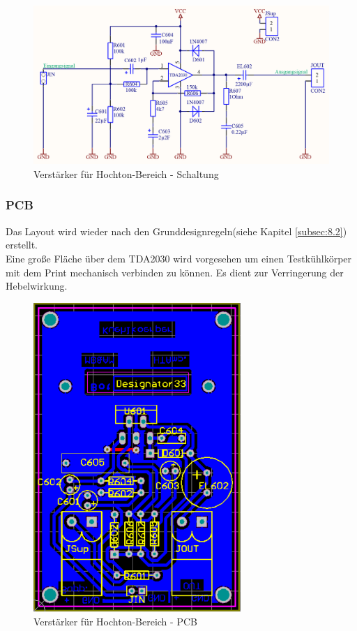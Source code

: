 \begin{figure} [H]
	\centering	
	\includegraphics[width=1\textwidth]{img/Print6/HTVerstaerker-Schem.PNG}
	\caption{Verstärker für Hochton-Bereich - Schaltung}
	\label {fig:5.1.2.1}
\end{figure}

\newpage
\subsubsection{PCB}\label{subsec:5.1.3}
Das Layout wird wieder nach den Grunddesignregeln(siehe Kapitel \ref{subsec:8.2}) erstellt.\\
Eine große Fläche über dem TDA2030 wird vorgesehen um einen Testkühlkörper mit dem Print mechanisch verbinden zu können.
Es dient zur Verringerung der Hebelwirkung.

\begin{figure} [H]
	\centering	
	\includegraphics[width=0.7\textwidth]{img/Print6/HTVerstaerker-PCB.PNG}
	\caption{Verstärker für Hochton-Bereich - PCB}
	\label {fig:5.1.3.1}
\end{figure}


